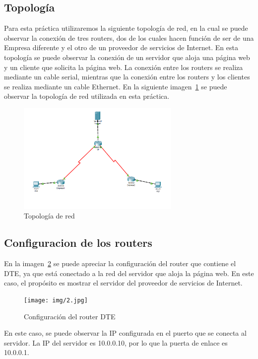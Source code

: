     \subsection{Topología}
    Para esta práctica utilizaremos la siguiente topología de red, en la cual se puede observar la conexión de tres routers, dos de los cuales hacen función de ser de una Empresa diferente y el otro de un proveedor de servicios de Internet. En esta topología se puede observar la conexión de un servidor que aloja una página web y un cliente que solicita la página web. La conexión entre los routers se realiza mediante un cable serial, mientras que la conexión entre los routers y los clientes se realiza mediante un cable Ethernet. En la siguiente imagen~\ref{fig:topologia} se puede observar la topología de red utilizada en esta práctica.
    \begin{figure}[H]
        \centering
        \includegraphics[width=0.7\textwidth]{img/Topologia.png}
        \caption{Topología de red}
        \label{fig:topologia}
    \end{figure}
    
    \subsection{Configuracion de los routers}
    En la imagen~\ref{fig:Imagen_Ejemplo2} se puede apreciar la configuración del router que contiene el DTE, ya que está conectado a la red del servidor que aloja la página web. En este caso, el propósito es mostrar el servidor del proveedor de servicios de Internet.
    \begin{figure}[H]
        \centering
        \texttt{[image: img/2.jpg]}
        \caption{Configuración del router DTE}
        \label{fig:Imagen_Ejemplo2}
    \end{figure}

    En este caso, se puede observar la IP configurada en el puerto que se conecta al servidor. La IP del servidor es 10.0.0.10, por lo que la puerta de enlace es 10.0.0.1.
    
